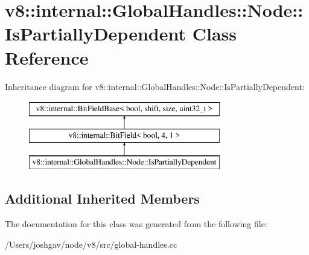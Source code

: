 \hypertarget{classv8_1_1internal_1_1_global_handles_1_1_node_1_1_is_partially_dependent}{}\section{v8\+:\+:internal\+:\+:Global\+Handles\+:\+:Node\+:\+:Is\+Partially\+Dependent Class Reference}
\label{classv8_1_1internal_1_1_global_handles_1_1_node_1_1_is_partially_dependent}
Inheritance diagram for v8\+:\+:internal\+:\+:Global\+Handles\+:\+:Node\+:\+:Is\+Partially\+Dependent\+:\begin{figure}[H]
\begin{center}
\leavevmode
\includegraphics[height=3.000000cm]{classv8_1_1internal_1_1_global_handles_1_1_node_1_1_is_partially_dependent}
\end{center}
\end{figure}
\subsection*{Additional Inherited Members}


The documentation for this class was generated from the following file\+:\begin{DoxyCompactItemize}
\item 
/\+Users/joshgav/node/v8/src/global-\/handles.\+cc\end{DoxyCompactItemize}
